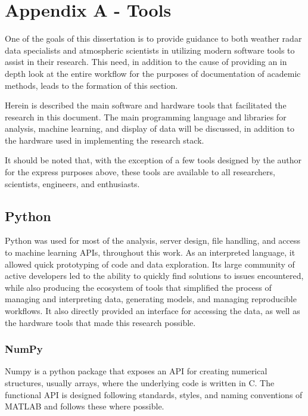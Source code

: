 \chapter{Appendix A - Tools}
\label{sec:appendix-a-tools}

One of the goals of this dissertation is to provide guidance to both weather radar data specialists and atmospheric scientists in utilizing modern software tools to assist in their research.
 This need, in addition to the cause of providing an in depth look at the entire workflow for the purposes of documentation of academic methods, leads to the formation of this section.

Herein is described the main software and hardware tools that facilitated the research in this document. 
The main programming language and libraries for analysis, machine learning, and display of data will be discussed, in addition to the hardware used in implementing the research stack.

It should be noted that, with the exception of a few tools designed by the author for the express purposes above, these tools are available to all researchers, scientists, engineers, and enthusiasts.

\section{Python}
\label{sec:appendix-a-python}

Python was used for most of the analysis, server design, file handling, and access to machine learning APIs, throughout this work. 
As an interpreted language, it allowed quick prototyping of code and data exploration. 
Its large community of active developers led to the ability to quickly find solutions to issues encountered, while also producing the ecosystem of tools that simplified the process of managing and interpreting data, generating models, and managing reproducible workflows. 
It also directly provided an interface for accessing the data, as well as the hardware tools that made this research possible.

\subsection{NumPy}
\label{ssec:appendix-a-numpy}

Numpy is a python package that exposes an API for creating numerical structures, usually arrays, where the underlying code is written in C.
The functional API is designed following standards, styles, and naming conventions of MATLAB and follows these where possible.

